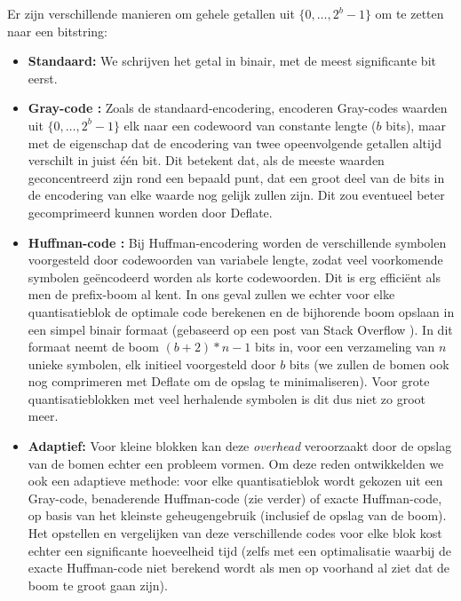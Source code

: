 Er zijn verschillende manieren om gehele getallen uit $\{0, \dots, 2^b - 1\}$ om te zetten naar een bitstring:
\begin{itemize}

\item \textbf{Standaard:} We schrijven het getal in binair, met de meest significante bit eerst.

\item \textbf{Gray-code \cite{ref:graycode}:} Zoals de standaard-encodering, encoderen Gray-codes waarden uit $\{0, \dots, 2^b - 1\}$ elk naar een codewoord van constante lengte ($b$ bits), maar met de eigenschap dat de encodering van twee opeenvolgende getallen altijd verschilt in juist \'e\'en bit. Dit betekent dat, als de meeste waarden geconcentreerd zijn rond een bepaald punt, dat een groot deel van de bits in de encodering van elke waarde nog gelijk zullen zijn. Dit zou eventueel beter gecomprimeerd kunnen worden door Deflate.

\item \textbf{Huffman-code \cite{ref:huffman_coding}:} Bij Huffman-encodering worden de verschillende symbolen voorgesteld door codewoorden van variabele lengte, zodat veel voorkomende symbolen ge\"encodeerd worden als korte codewoorden. Dit is erg effici\"ent als men de prefix-boom al kent. In ons geval zullen we echter voor elke quantisatieblok de optimale code berekenen en de bijhorende boom opslaan in een simpel binair formaat (gebaseerd op een post van Stack Overflow \cite{ref:huffman_tree}). In dit formaat neemt de boom $(b + 2)*n - 1$ bits in, voor een verzameling van $n$ unieke symbolen, elk initieel voorgesteld door $b$ bits (we zullen de bomen ook nog comprimeren met Deflate om de opslag te minimaliseren). Voor grote quantisatieblokken met veel herhalende symbolen is dit dus niet zo groot meer.

\item \textbf{Adaptief:} Voor kleine blokken kan deze \textit{overhead} veroorzaakt door de opslag van de bomen echter een probleem vormen. Om deze reden ontwikkelden we ook een adaptieve methode: voor elke quantisatieblok wordt gekozen uit een Gray-code, benaderende Huffman-code (zie verder) of exacte Huffman-code, op basis van het kleinste geheugengebruik (inclusief de opslag van de boom). Het opstellen en vergelijken van deze verschillende codes voor elke blok kost echter een significante hoeveelheid tijd (zelfs met een optimalisatie waarbij de exacte Huffman-code niet berekend wordt als men op voorhand al ziet dat de boom te groot gaan zijn).\\


\end{itemize}
